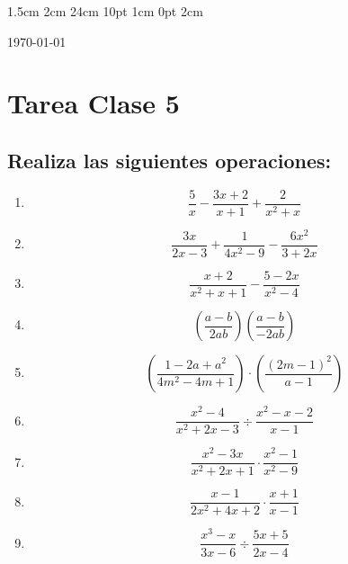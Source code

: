 \documentclass[12pt,letterpaper]{report}
\begin{document}
\setmargins{2.5cm}      
{1.5cm}                     
{2cm}  
{24cm}                    
{10pt}                          
{1cm}                          
{0pt}                             
{2cm}
\begin{flushright}
\today
\end{flushright}
\vspace{-1.75cm}
\section*{Tarea Clase 5}
\subsection*{Realiza las siguientes operaciones:}
\begin{enumerate}
\item \begin{equation*}
\frac{5}{x}-\frac{3x+2}{x+1}+\frac{2}{x^2+x}
\end{equation*}
\item \begin{equation*}
\frac{3x}{2x-3}+\frac{1}{4x^2-9}-\frac{6x^2}{3+2x}
\end{equation*}
\item \begin{equation*}
\frac{x+2}{x^2+x+1}-\frac{5-2x}{x^2-4}
\end{equation*}
\item \begin{equation*}
    \left(\frac{a-b}{2ab}\right) \left(\frac{a-b}{-2ab} \right)
\end{equation*}
\item \begin{equation*}
    \left(\frac{1-2a+a^2}{4m^2-4m+1}\right) \cdot \left( \frac{(2m-1)^2}{a-1} \right)
\end{equation*}
\item \begin{equation*}
    \frac{x^2-4}{x^2+2x-3} \div \frac{x^2-x-2}{x-1}
\end{equation*}
\item \begin{equation*}
    \frac{x^2-3x}{x^2+2x+1} \cdot \frac{x^2-1}{x^2-9}
\end{equation*}
\item \begin{equation*}
    \frac{x-1}{2x^2+4x+2} \cdot \frac{x+1}{x-1}
\end{equation*}
\item \begin{equation*}
    \frac{x^3-x}{3x-6} \div \frac{5x+5}{2x-4}
\end{equation*}
\end{enumerate}
\end{document}
